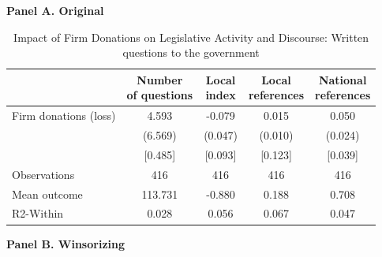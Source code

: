 \documentclass[12pt,a4paper]{article}
\begin{document}
\begin{table}[H]
\caption{Impact of Firm Donations on Legislative Activity and Discourse: Written questions to the government
}
\label{tab:questions}

\bigskip
\textbf{Panel A. Original}\\[1mm]

{
\def\sym#1{\ifmmode^{#1}\else\(^{#1}\)\fi}
\begin{tabular}{lcccc}
\hline\hline
                & \shortstack{Number\\of questions}
                & \shortstack{Local\\index}
                & \shortstack{Local\\references}
                & \shortstack{National\\references} \\
\hline
Firm donations (loss)
                &    4.593        &   -0.079        &    0.015        &    0.050        \\
                &    (6.569)      &   (0.047)       &   (0.010)       &   (0.024)       \\
                &    [0.485]      &   [0.093]       &   [0.123]       &   [0.039]       \\
Observations    &     416         &     416         &     416         &     416         \\
Mean outcome    &   113.731       &    -0.880       &    0.188        &    0.708        \\
R2-Within       &    0.028        &    0.056        &    0.067        &    0.047        \\
\hline\hline
\end{tabular}
}

\bigskip
\textbf{Panel B. Winsorizing}\\[1mm]


\end{table}
\end{document}
